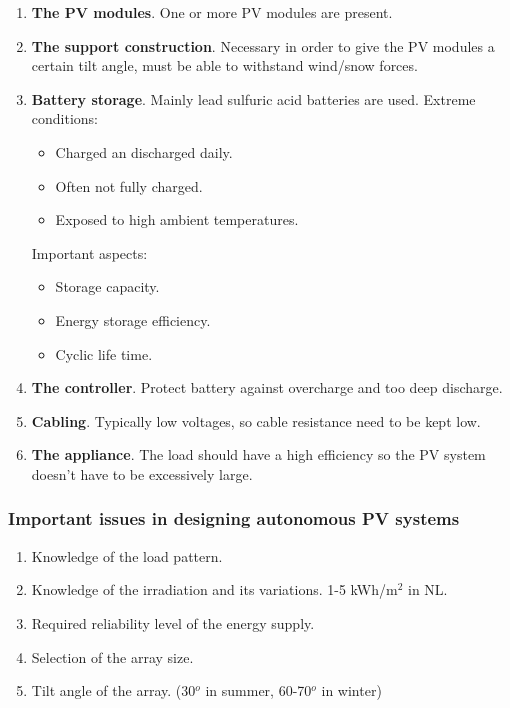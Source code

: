 \documentclass[a4paper,10pt]{article}
\begin{document}
\begin{enumerate}[label=\alph*.]
 \item \textbf{The PV modules}. One or more PV modules are present.
 \item \textbf{The support construction}. Necessary in order to give the PV modules a certain tilt angle, must be able to withstand wind/snow forces.
 \item \textbf{Battery storage}. Mainly lead sulfuric acid batteries are used. Extreme conditions:
 \begin{itemize}
  \item Charged an discharged daily.
  \item Often not fully charged.
  \item Exposed to high ambient temperatures.
 \end{itemize}
 Important aspects:
 \begin{itemize}
  \item Storage capacity.
  \item Energy storage efficiency.
  \item Cyclic life time.
 \end{itemize}
 \item \textbf{The controller}. Protect battery against overcharge and too deep discharge. 
 \item \textbf{Cabling}. Typically low voltages, so cable resistance need to be kept low.
 \item \textbf{The appliance}. The load should have a high efficiency so the PV system doesn't have to be excessively large.
\end{enumerate}

\subsubsection{Important issues in designing autonomous PV systems}
\begin{enumerate}
 \item Knowledge of the load pattern.
 \item Knowledge of the irradiation and its variations. 1-5 kWh/m$^2$ in NL.
 \item Required reliability level of the energy supply. 
 \item Selection of the array size.
 \item Tilt angle of the array. (30$^o$ in summer, 60-70$^o$ in winter)
\end{enumerate}
\end{document}
